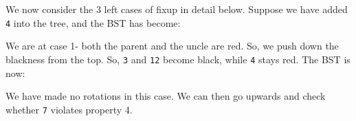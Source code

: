 \documentclass[a4paper, openany]{memoir}
\begin{document}
We now consider the 3 left cases of fixup in detail below. Suppose we have added \texttt{4} into the tree, and the BST has become:
\begin{center}
\end{center}
We are at case 1- both the parent and the uncle are red. So, we push down the blackness from the top. So, \texttt{3} and \texttt{12} become black, while \texttt{4} stays red. The BST is now:
\begin{center}
\end{center}
We have made no rotations in this case. We can then go upwards and check whether \texttt{7} violates property 4. 
\end{document}
